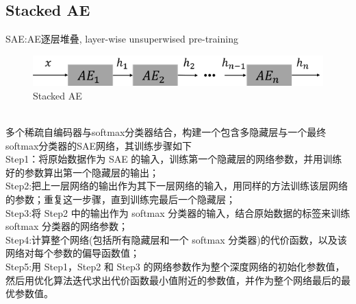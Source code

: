 \documentclass{article}
\begin{document}
\subsection{Stacked AE }
SAE:AE逐层堆叠, layer-wise unsuperwised pre-training 
\begin{figure}[h]
\centering
\includegraphics[width=0.8\linewidth]{6.png}
\caption{Stacked AE}
\end{figure}\\
多个稀疏自编码器与softmax分类器结合，构建一个包含多隐藏层与一个最终softmax分类器的SAE网络，其训练步骤如下\\
Step1：将原始数据作为 SAE 的输入，训练第一个隐藏层的网络参数，并用训练好的参数算出第一个隐藏层的输出；\\
Step2:把上一层网络的输出作为其下一层网络的输入，用同样的方法训练该层网络的参数；重复这一步骤，直到训练完最后一个隐藏层；\\
Step3:将 Step2 中的输出作为 softmax 分类器的输入，结合原始数据的标签来训练 softmax 分类器的网络参数；\\
Step4:计算整个网络(包括所有隐藏层和一个 softmax 分类器)的代价函数，以及该网络对每个参数的偏导函数值；\\
Step5:用 Step1，Step2 和 Step3 的网络参数作为整个深度网络的初始化参数值，然后用优化算法迭代求出代价函数最小值附近的参数值，并作为整个网络最后的最优参数值。\\
\end{document}
